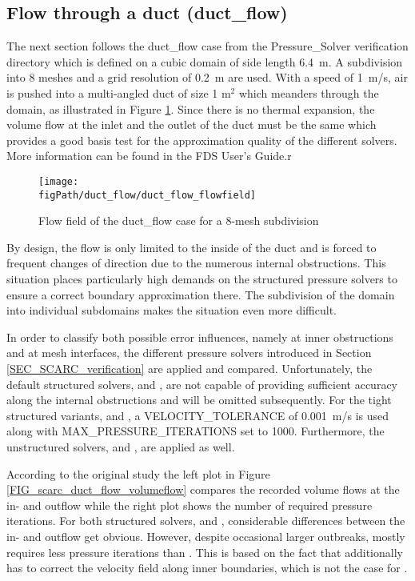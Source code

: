 \subsection{Flow through a duct ({\ct duct\_flow})}
\label{SEC_SCARC_duct_flow}

The next section follows the {\ct duct\_flow} case from the Pressure\_Solver verification directory which is defined on a cubic domain of side length 6.4~m. A subdivision into 8 meshes and a grid resolution of 0.2~m are used. 
With a speed of 1~m/s, air is pushed into a multi-angled duct of size 1 m$^2$ which meanders through the domain, as
illustrated in Figure \ref{FIG_scarc_duct_flow_flowfield}. 
Since there is no thermal expansion, the volume flow at the inlet and the outlet of the duct must be the same which provides a good basis test for the approximation quality of the different solvers. More information can be found in the FDS User's Guide\cite{McGrattan:2018:UG}.r


\begin{figure}[ht]
\centering\texttt{[image: \\figPath/duct\_flow/duct\_flow\_flowfield]}
\caption{Flow field of the {\ct duct\_flow} case for a 8-mesh subdivision}
\label{FIG_scarc_duct_flow_flowfield}
\end{figure}

By design, the flow is only limited to the inside of the duct and is forced to frequent changes of direction due to the numerous internal obstructions. This situation places particularly high demands on the structured pressure solvers to ensure a correct boundary approximation there. The subdivision of the domain into individual subdomains makes the situation even more difficult.

In order to classify both possible error influences, namely at inner obstructions and at mesh interfaces, the different pressure solvers introduced in Section \ref{SEC_SCARC_verification} are applied and compared. Unfortunately, the default structured solvers, \fftdefault{} and \scarcdefault{}, are not capable of providing sufficient accuracy along the internal obstructions and will be omitted subsequently. For the tight structured variants, \ffttight{} and \scarctight{}, a {\ct VELOCITY\_TOLERANCE} of 0.001~m/s is used along with {\ct MAX\_PRESSURE\_ITERATIONS} set to 1000. Furthermore, the unstructured solvers, \uglmat{} and \uscarc{},  are applied as well.
 
According to the original study the left plot in Figure \ref{FIG_scarc_duct_flow_volumeflow} compares the recorded volume flows at the in- and outflow while the right plot shows the number of required pressure iterations.
For both structured solvers, \ffttight{} and \scarctight{}, considerable differences between the in- and outflow get obvious. However, despite occasional larger outbreaks, \scarctight{} mostly requires less pressure iterations than \ffttight{}. This is based on the fact that \ffttight{} additionally has to correct the velocity field along inner boundaries, which is not the case for \scarctight{}. 

